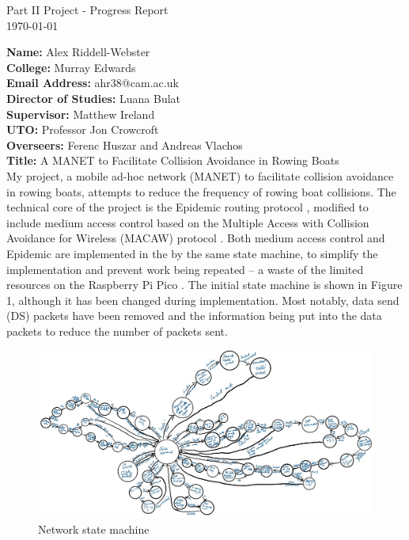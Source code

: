 \documentclass[10pt, a4paper]{article}
\begin{document}
\begin{center}
\Huge{Part II Project - Progress Report} \\
\Large{\today} \\
\end{center}
\textbf{Name:} Alex Riddell-Webster \\
\textbf{College:} Murray Edwards \\
\textbf{Email Address:} ahr38@cam.ac.uk \\
\textbf{Director of Studies:} Luana Bulat \\
\textbf{Supervisor:} Matthew Ireland \\
\textbf{UTO:} Professor Jon Crowcroft\\
\textbf{Overseers:}  Ferenc Huszar and Andreas Vlachos \\
\textbf{Title:} A MANET to Facilitate Collision Avoidance in Rowing Boats
\vspace{20px}\\
My project, a mobile ad-hoc network (MANET) to facilitate collision avoidance in rowing boats, attempts to reduce the frequency of rowing boat collisions. The technical core of the project is the Epidemic routing protocol \cite{epidemic}, modified to include medium access control based on the Multiple Access with Collision Avoidance for Wireless (MACAW) protocol \cite{macaw}. Both medium access control and Epidemic are implemented in the by the same state machine, to simplify the implementation and prevent work being repeated -- a waste of the limited resources on the Raspberry Pi Pico \cite{pico}. The initial state machine is shown in Figure 1, although it has been changed during implementation. Most notably, data send (DS) packets have been removed and the information being put into the data packets to reduce the number of packets sent. \\

\begin{figure}[h]
\caption{Network state machine}
\begin{center}
\includegraphics[scale=0.4]{net.jpg}
\end{center}
\end{figure}
\end{document}
